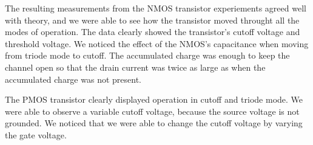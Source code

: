 The resulting measurements from the NMOS transistor experiements agreed well with theory, and we were able to see how the transistor moved throught all the modes of operation. The data clearly showed the transistor's cutoff voltage and threshold voltage. We noticed the effect of the NMOS's capacitance when moving from triode mode to cutoff. The accumulated charge was enough to keep the channel open so that the drain current was twice as large as when the accumulated charge was not present. 
  
The PMOS transistor clearly displayed operation in cutoff and triode mode. We were able to observe a variable cutoff voltage, because the source voltage is not grounded. We noticed that we were able to change the cutoff voltage by varying the gate voltage.

